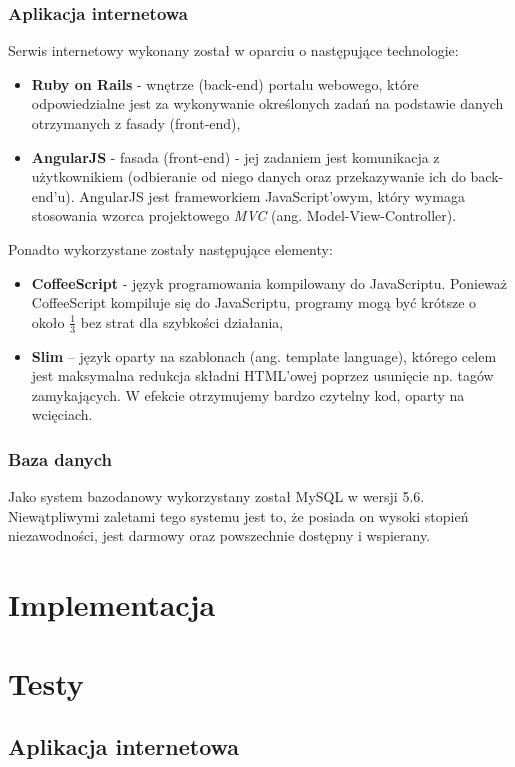\documentclass[eng,oneside]{mgr}
\begin{document}
\subsection{Aplikacja internetowa}
Serwis internetowy wykonany został w oparciu o następujące technologie:
\begin{itemize}
	\item \textbf{Ruby on Rails} - wnętrze (back-end) portalu webowego, które odpowiedzialne jest za wykonywanie określonych zadań na podstawie danych otrzymanych z fasady (front-end),
	\item \textbf{AngularJS} - fasada (front-end) - jej zadaniem jest komunikacja z użytkownikiem (odbieranie od niego danych oraz przekazywanie ich do back-end'u). AngularJS jest frameworkiem JavaScript'owym, który wymaga stosowania wzorca projektowego \emph{MVC} (ang. Model-View-Controller).
\end{itemize}
Ponadto wykorzystane zostały następujące elementy:
\begin{itemize}
	\item \textbf{CoffeeScript} - język programowania kompilowany do JavaScriptu. Ponieważ CoffeeScript kompiluje się do JavaScriptu, programy mogą być krótsze o około $\frac{1}{3}$ bez strat dla szybkości działania,
	\item \textbf{Slim} – język oparty na szablonach (ang. template language), którego celem jest maksymalna redukcja składni HTML’owej poprzez usunięcie np. tagów zamykających. W efekcie otrzymujemy bardzo czytelny kod, oparty na wcięciach.
\end{itemize}

\subsection{Baza danych}
Jako system bazodanowy wykorzystany został MySQL w wersji 5.6. Niewątpliwymi zaletami tego systemu jest to, że posiada on wysoki stopień niezawodności, jest darmowy oraz powszechnie dostępny i wspierany.

\chapter{Implementacja}
\chapter{Testy}
\section{Aplikacja internetowa}
\end{document}
